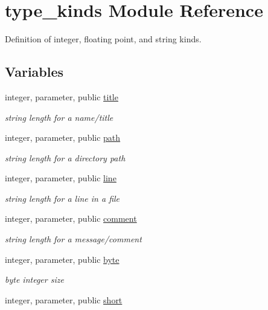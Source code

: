 \hypertarget{namespacetype__kinds}{}\section{type\+\_\+kinds Module Reference}
\label{namespacetype__kinds}


Definition of integer, floating point, and string kinds.  


\subsection*{Variables}
\begin{DoxyCompactItemize}
\item 
integer, parameter, public \hyperlink{namespacetype__kinds_aa2f577aea616d9b9bb91ce438bdf3c02}{title}
\begin{DoxyCompactList}\small\item\em string length for a name/title \end{DoxyCompactList}\item 
integer, parameter, public \hyperlink{namespacetype__kinds_a05ab6f6ff4279480c4fd6d8b04a3efbf}{path}
\begin{DoxyCompactList}\small\item\em string length for a directory path \end{DoxyCompactList}\item 
integer, parameter, public \hyperlink{namespacetype__kinds_af0560ef37c612847670ffbfba8a9bc33}{line}
\begin{DoxyCompactList}\small\item\em string length for a line in a file \end{DoxyCompactList}\item 
integer, parameter, public \hyperlink{namespacetype__kinds_abb1584a815b1c1b79301d6f922366eec}{comment}
\begin{DoxyCompactList}\small\item\em string length for a message/comment \end{DoxyCompactList}\item 
integer, parameter, public \hyperlink{namespacetype__kinds_a13366a08a0935a72c203e1b880b4d49e}{byte}
\begin{DoxyCompactList}\small\item\em byte integer size \end{DoxyCompactList}\item 
integer, parameter, public \hyperlink{namespacetype__kinds_ab4d7bfce672e6152e78f87f8aa5b2e04}{short}

\end{DoxyCompactItemize}
